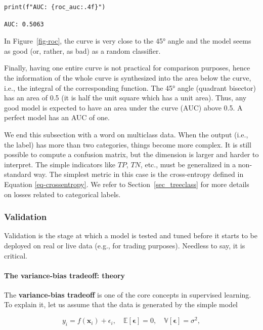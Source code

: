 \begin{verbatim}
print(f"AUC: {roc_auc:.4f}")
\end{verbatim}

\begin{verbatim}
AUC: 0.5063
\end{verbatim}

In Figure~\ref{fig-roc}, the curve is very close to the 45° angle and the model seems as good (or, rather, as bad) as a random classifier.

Finally, having one entire curve is not practical for comparison purposes, hence the information of the whole curve is synthesized into the area below the curve, i.e., the integral of the corresponding function. The 45° angle (quadrant bisector) has an area of 0.5 (it is half the unit square which has a unit area). Thus, any good model is expected to have an area under the curve (AUC) above 0.5. A perfect model has an AUC of one.

We end this subsection with a word on multiclass data. When the output (i.e., the label) has more than two categories, things become more complex. It is still possible to compute a confusion matrix, but the dimension is larger and harder to interpret. The simple indicators like $TP$, $TN$, etc., must be generalized in a non-standard way. The simplest metric in this case is the cross-entropy defined in Equation \ref{eq-crossentropy}. We refer to Section~\ref{sec_treeclass} for more details on losses related to categorical labels.

\subsubsection{Validation}

Validation is the stage at which a model is tested and tuned before it starts to be deployed on real or live data (e.g., for trading purposes). Needless to say, it is critical.

\paragraph{The variance-bias tradeoff: theory}

The \textbf{variance-bias tradeoff} is one of the core concepts in supervised learning. To explain it, let us assume that the data is generated by the simple model

\begin{equation}
y_i=f(\textbf{x}_i)+\epsilon_i, \quad   \mathbb{E}[\boldsymbol{\epsilon}]=0, \quad \mathbb{V}[\boldsymbol{\epsilon}]=\sigma^2,
\end{equation}

